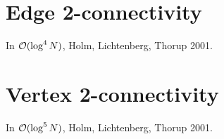 
\section{Edge 2-connectivity}

In ${\cal O}(\log^4 N)$, Holm, Lichtenberg, Thorup 2001.



\section{Vertex 2-connectivity}

In ${\cal O}(\log^5 N)$, Holm, Lichtenberg, Thorup 2001.


